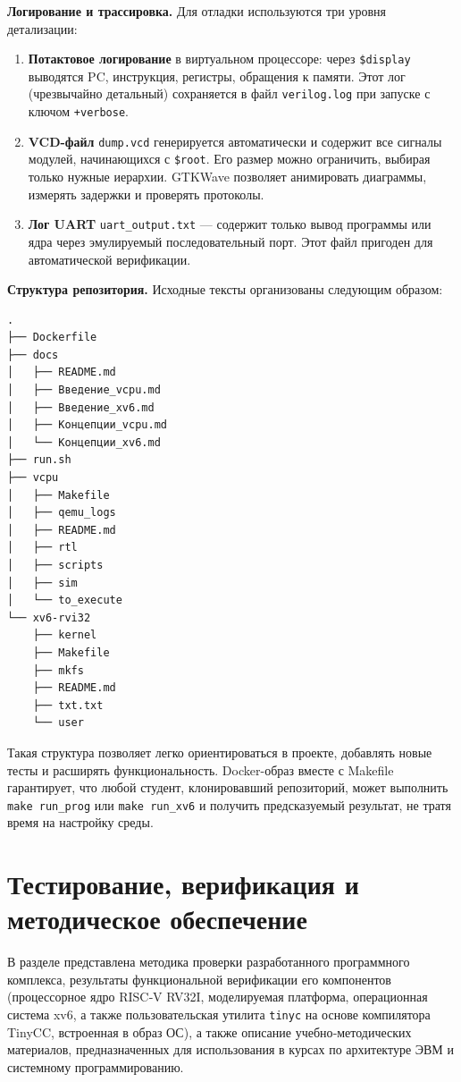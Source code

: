 \textbf{Логирование и трассировка.} Для отладки используются три уровня детализации:
\begin{enumerate}
  \item \textbf{Потактовое логирование} в виртуальном процессоре: через \texttt{\$display} выводятся PC, инструкция, регистры, обращения к памяти. Этот лог (чрезвычайно детальный) сохраняется в файл \texttt{verilog.log} при запуске с ключом \texttt{+verbose}.
  \item \textbf{VCD-файл} \texttt{dump.vcd} генерируется автоматически и содержит все сигналы модулей, начинающихся с \texttt{\$root}. Его размер можно ограничить, выбирая только нужные иерархии. GTKWave позволяет анимировать диаграммы, измерять задержки и проверять протоколы.
  \item \textbf{Лог UART} \texttt{uart\_output.txt} — содержит только вывод программы или ядра через эмулируемый последовательный порт. Этот файл пригоден для автоматической верификации.
\end{enumerate}

\textbf{Структура репозитория.} Исходные тексты организованы следующим образом:

\begin{verbatim}
.
├── Dockerfile
├── docs
│   ├── README.md
│   ├── Введение_vcpu.md
│   ├── Введение_xv6.md
│   ├── Концепции_vcpu.md
│   └── Концепции_xv6.md
├── run.sh
├── vcpu
│   ├── Makefile
│   ├── qemu_logs
│   ├── README.md
│   ├── rtl
│   ├── scripts
│   ├── sim
│   └── to_execute
└── xv6-rvi32
    ├── kernel
    ├── Makefile
    ├── mkfs
    ├── README.md
    ├── txt.txt
    └── user
\end{verbatim}
Такая структура позволяет легко ориентироваться в проекте, добавлять новые тесты и расширять функциональность. Docker-образ вместе с Makefile гарантирует, что любой студент, клонировавший репозиторий, может выполнить \texttt{make run\_prog} или \texttt{make run\_xv6} и получить предсказуемый результат, не тратя время на настройку среды.

\section{Тестирование, верификация и методическое обеспечение}
\label{sec:testing}

В разделе представлена методика проверки разработанного программного комплекса, результаты функциональной верификации его компонентов (процессорное ядро RISC‑V RV32I, моделируемая платформа, операционная система xv6, а также пользовательская утилита \texttt{tinyc} на основе компилятора TinyCC, встроенная в образ ОС), а также описание учебно‑методических материалов, предназначенных для использования в курсах по архитектуре ЭВМ и системному программированию.

